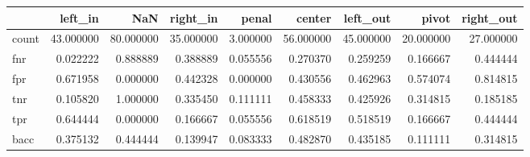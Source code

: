 \begin{tabular}{lrrrrrrrr}
\toprule
{} &    left\_in &        NaN &   right\_in &     penal &     center &   left\_out &      pivot &  right\_out \\
\midrule
count &  43.000000 &  80.000000 &  35.000000 &  3.000000 &  56.000000 &  45.000000 &  20.000000 &  27.000000 \\
fnr   &   0.022222 &   0.888889 &   0.388889 &  0.055556 &   0.270370 &   0.259259 &   0.166667 &   0.444444 \\
fpr   &   0.671958 &   0.000000 &   0.442328 &  0.000000 &   0.430556 &   0.462963 &   0.574074 &   0.814815 \\
tnr   &   0.105820 &   1.000000 &   0.335450 &  0.111111 &   0.458333 &   0.425926 &   0.314815 &   0.185185 \\
tpr   &   0.644444 &   0.000000 &   0.166667 &  0.055556 &   0.618519 &   0.518519 &   0.166667 &   0.444444 \\
bacc  &   0.375132 &   0.444444 &   0.139947 &  0.083333 &   0.482870 &   0.435185 &   0.111111 &   0.314815 \\
\bottomrule
\end{tabular}
